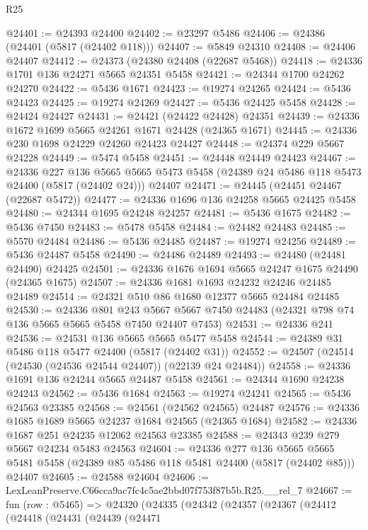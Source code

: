 \begin{lexlean}{R25}
\begin{coremodule}
@24401 := @24393 @24400
@24402 := @23297 @5486
@24406 := @24386 (@24401 (@5817 (@24402 @118)))
@24407 := @5849 @24310
@24408 := @24406 @24407
@24412 := @24373 (@24380 @24408 (@22687 @5468))
@24418 := @24336 @1701 @136 @24271 @5665 @24351 @5458
@24421 := @24344 @1700 @24262 @24270
@24422 := @5436 @1671
@24423 := @19274 @24265
@24424 := @5436 @24423
@24425 := @19274 @24269
@24427 := @5436 @24425 @5458
@24428 := @24424 @24427
@24431 := @24421 (@24422 @24428) @24351
@24439 := @24336 @1672 @1699 @5665 @24261 @1671 @24428 (@24365 @1671)
@24445 := @24336 @230 @1698 @24229 @24260 @24423 @24427
@24448 := @24374 @229 @5667 @24228
@24449 := @5474 @5458
@24451 := @24448 @24449 @24423
@24467 := @24336
    @227
    @136
    @5665
    @5665
    @5473
    @5458
    (@24389 @24 @5486 @118 @5473 @24400 (@5817 (@24402 @24)))
    @24407
@24471 := @24445 (@24451 @24467 (@22687 @5472))
@24477 := @24336 @1696 @136 @24258 @5665 @24425 @5458
@24480 := @24344 @1695 @24248 @24257
@24481 := @5436 @1675
@24482 := @5436 @7450
@24483 := @5478 @5458
@24484 := @24482 @24483
@24485 := @5570 @24484
@24486 := @5436 @24485
@24487 := @19274 @24256
@24489 := @5436 @24487 @5458
@24490 := @24486 @24489
@24493 := @24480 (@24481 @24490) @24425
@24501 := @24336 @1676 @1694 @5665 @24247 @1675 @24490 (@24365 @1675)
@24507 := @24336 @1681 @1693 @24232 @24246 @24485 @24489
@24514 := @24321 @510 @86 @1680 @12377 @5665 @24484 @24485
@24530 := @24336
    @801
    @243
    @5667
    @5667
    @7450
    @24483
    (@24321 @798 @74 @136 @5665 @5665 @5458 @7450 @24407 @7453)
@24531 := @24336 @241
@24536 := @24531 @136 @5665 @5665 @5477 @5458
@24544 := @24389 @31 @5486 @118 @5477 @24400 (@5817 (@24402 @31))
@24552 := @24507 (@24514 (@24530 (@24536 @24544 @24407)) (@22139 @24 @24484))
@24558 := @24336 @1691 @136 @24244 @5665 @24487 @5458
@24561 := @24344 @1690 @24238 @24243
@24562 := @5436 @1684
@24563 := @19274 @24241
@24565 := @5436 @24563 @23385
@24568 := @24561 (@24562 @24565) @24487
@24576 := @24336 @1685 @1689 @5665 @24237 @1684 @24565 (@24365 @1684)
@24582 := @24336 @1687 @251 @24235 @12062 @24563 @23385
@24588 := @24343 @239 @279 @5667 @24234 @5483 @24563
@24604 := @24336
    @277
    @136
    @5665
    @5665
    @5481
    @5458
    (@24389 @85 @5486 @118 @5481 @24400 (@5817 (@24402 @85)))
    @24407
@24605 := @24588 @24604
@24606 := LexLeanPreserve.C66cca9ac7fc4c5ae2bbd07f753f87b5b.R25.__rel_7
@24667 := fun (row : @5465) =>
  @24320
    (@24335
      (@24342
        (@24357
          (@24367
            (@24412
              (@24418
                (@24431
                  (@24439
                    (@24471

\end{coremodule}
\end{lexlean}
